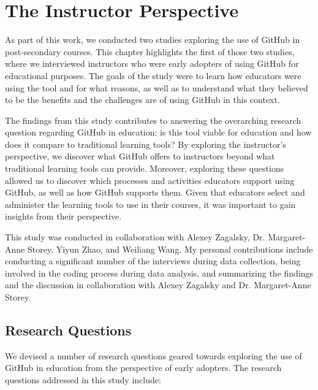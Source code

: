 \chapter{The Instructor Perspective}
As part of this work, we conducted two studies exploring the use of GitHub in post-secondary courses. This chapter highlights the first of those two studies, where we interviewed instructors who were early adopters of using GitHub for educational purposes. The goals of the study were to learn how educators were using the tool and for what reasons, as well as to understand what they believed to be the benefits and the challenges are of using GitHub in this context.

The findings from this study contributes to answering the overarching research question regarding GitHub in education: is this tool viable for education and how does it compare to traditional learning tools? By exploring the instructor's perspective, we discover what GitHub offers to instructors beyond what traditional learning tools can provide. Moreover, exploring these questions allowed us to discover which processes and activities educators support using GitHub, as well as how GitHub supports them. Given that educators select and administer the learning tools to use in their courses, it was important to gain insights from their perspective.

This study was conducted in collaboration with Alexey Zagalsky, Dr. Margaret-Anne Storey, Yiyun Zhao, and Weiliang Wang. My personal contributions include conducting a significant number of the interviews during data collection, being involved in the coding process during data analysis, and summarizing the findings and the discussion in collaboration with Alexey Zagalsky and Dr. Margaret-Anne Storey. %


\section{Research Questions}
We devised a number of research questions geared towards exploring the use of GitHub in education from the perspective of early adopters. The research questions addressed in this study include:


